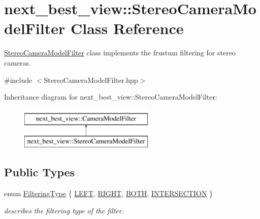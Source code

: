 \hypertarget{classnext__best__view_1_1StereoCameraModelFilter}{\section{next\-\_\-best\-\_\-view\-:\-:\-Stereo\-Camera\-Model\-Filter \-Class \-Reference}
\label{classnext__best__view_1_1StereoCameraModelFilter}
}


\hyperlink{classnext__best__view_1_1StereoCameraModelFilter}{\-Stereo\-Camera\-Model\-Filter} class implements the frustum filtering for stereo cameras.  




{\ttfamily \#include $<$\-Stereo\-Camera\-Model\-Filter.\-hpp$>$}

\-Inheritance diagram for next\-\_\-best\-\_\-view\-:\-:\-Stereo\-Camera\-Model\-Filter\-:\begin{figure}[H]
\begin{center}
\leavevmode
\includegraphics[height=2.000000cm]{classnext__best__view_1_1StereoCameraModelFilter}
\end{center}
\end{figure}
\subsection*{\-Public \-Types}
\begin{DoxyCompactItemize}
\item 
enum \hyperlink{classnext__best__view_1_1StereoCameraModelFilter_a60feeec608139dd1bc248f43b7a0b9bc}{\-Filtering\-Type} \{ \hyperlink{classnext__best__view_1_1StereoCameraModelFilter_a60feeec608139dd1bc248f43b7a0b9bca64a172eb76db0ab76e9c3770020a4f06}{\-L\-E\-F\-T}, 
\hyperlink{classnext__best__view_1_1StereoCameraModelFilter_a60feeec608139dd1bc248f43b7a0b9bcad597adcefed24c9fe0194f5b83b37be3}{\-R\-I\-G\-H\-T}, 
\hyperlink{classnext__best__view_1_1StereoCameraModelFilter_a60feeec608139dd1bc248f43b7a0b9bca2608572ea4db2aad0aeed31021cd7ee4}{\-B\-O\-T\-H}, 
\hyperlink{classnext__best__view_1_1StereoCameraModelFilter_a60feeec608139dd1bc248f43b7a0b9bcaaaa3cd4a57f778fccb9b4ac45fb00f53}{\-I\-N\-T\-E\-R\-S\-E\-C\-T\-I\-O\-N}
 \}
\begin{DoxyCompactList}\small\item\em describes the filtering type of the filter. \end{DoxyCompactList}\end{DoxyCompactItemize}
